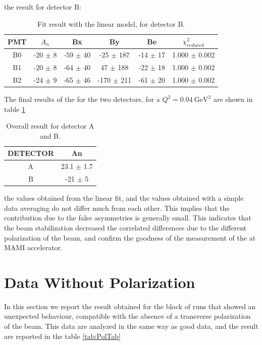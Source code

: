 the result for detector B: 

\begin{table}[hbtp]
\centering
\begin{tabular}{c|c|c|c|c|c}
\hline
 PMT   & $A_{n}$         & Bx         & By           & Be        & $\chi^{2}_{reduced}$\\
\hline
 B0    & -20 $\pm$ 8 & -59 $\pm$ 40 & -25 $\pm$ 187  & -14 $\pm$ 17  & 1.000 $\pm$ 0.002 \\
 B1    & -20 $\pm$ 8  & -64 $\pm$ 40 & 47 $\pm$ 188    & -22 $\pm$ 18 & 1.000 $\pm$ 0.002 \\
 B2    & -24 $\pm$ 9 & -65 $\pm$ 46 & -170 $\pm$ 211 & -61 $\pm$ 20 & 1.000 $\pm$ 0.002 \\
\hline
\end{tabular}
\caption{Fit result with the linear model, for detector B.}
\end{table}

The final results of the \transv for the two detectors, for a $Q^{2} = \SI{0.04}{\giga \electronvolt \squared}$ are shown in table \ref{tab:RisultatiBellissimiFinali}

\begin{table}[h]
\centering
\begin{tabular}{c|c}
\hline
 DETECTOR   & An    \\
\hline
 A          & 23.1 $\pm$ 1.7  \\
 B          & -21 $\pm$ 5   \\
\hline
\end{tabular}
\caption{Overall result for detector A and B.}
\label{tab:RisultatiBellissimiFinali}
\end{table}

the values obtained from the linear fit, and the values obtained with a simple data averaging do not differ much from each other. This implies that the contribution due to the false asymmetries is generally small. This indicates that the beam stabilization decreased the correlated differences due to the different polarization of the beam, and confirm the goodness of the measurement of the \transv at MAMI accelerator.  

\section{Data Without Polarization}

In this section we report the result obtained for the block of runs that showed an unexpected behaviour, compatible with the absence of a transverse polarization of the beam. This data are analyzed in the same way as good data, and the result are reported in the table \ref{tab:PolTab} 

